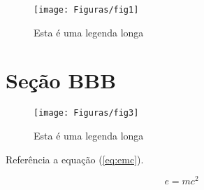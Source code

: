 \documentclass{article}
\begin{document}
	
	\begin{figure}[H]
		\centering
		\texttt{[image: Figuras/fig1]}
		\caption[Legenda curta]{Esta é uma legenda longa}
		\label{fig:fig1}
	\end{figure}
	
	\section{Seção BBB}	
	
	\begin{figure}[H]
		\centering
		\texttt{[image: Figuras/fig3]}
		\caption[Legenda curta]{Esta é uma legenda longa}
		\label{fig:fig3}
	\end{figure}
	
	Referência a equação (\ref{eq:emc}).
	
	\begin{equation}
	\label{eq:emc}
		e=mc^2
	\end{equation}
	
	
\end{document}
